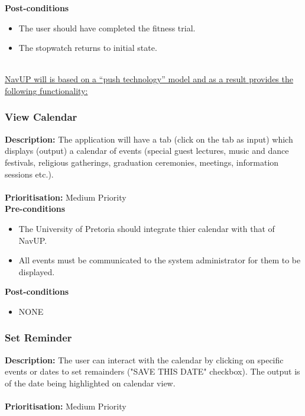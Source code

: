 \documentclass[runningheads,a4paper]{article}
\begin{document}
\textbf{Post-conditions}
\begin{itemize}
  	\item The user should have completed the fitness trial.
	\item The stopwatch returns to initial state.
\end{itemize}

\noindent \\ \underline{NavUP will is based on a “push technology” model and as a result provides the following functionality:}

\subsubsection{View Calendar}

\textbf{Description:} The application will have a tab (click on the tab as input) which displays (output) a calendar of events (special guest lectures, music and dance festivals, religious gatherings, graduation ceremonies, meetings, information sessions etc.).\\\\
\noindent
\textbf{Prioritisation:} Medium Priority\\
  
  
\textbf{Pre-conditions}
\begin{itemize}
	\item The University of Pretoria should integrate thier calendar with that of NavUP.
	\item All events must be communicated to the system administrator for them to be displayed.
\end{itemize}
  
\textbf{Post-conditions}
\begin{itemize}
  	\item NONE
\end{itemize}

\subsubsection{Set Reminder}

\textbf{Description:} The user can interact with the calendar by clicking on specific events or dates to set remainders ("SAVE THIS DATE" checkbox). The output is of the date being highlighted on calendar view.\\\\
\noindent
\textbf{Prioritisation:} Medium Priority\\
  
\end{document}
